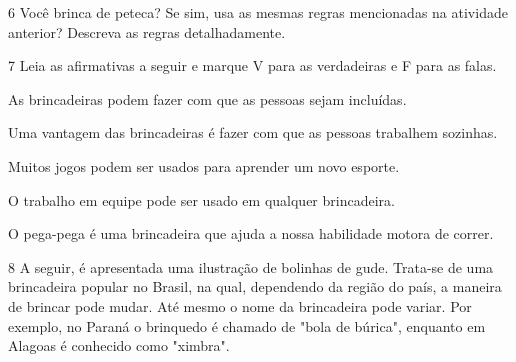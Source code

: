 \num{6} Você brinca de peteca? Se sim, usa as mesmas regras mencionadas na atividade anterior? Descreva as regras detalhadamente.


\num{7} Leia as afirmativas a seguir e marque V para as verdadeiras e F para
  as falas.

\begin{boxlist}
\item As brincadeiras podem fazer com que as pessoas sejam incluídas. 

\item Uma vantagem das brincadeiras é fazer com que as pessoas trabalhem sozinhas. 

\item Muitos jogos podem ser usados para aprender um novo esporte. 

\item O trabalho em equipe pode ser usado em qualquer brincadeira. 

\item O pega-pega é uma brincadeira que ajuda a nossa habilidade motora de correr. 
\end{boxlist}


\num{8} A seguir, é apresentada uma ilustração de bolinhas de gude. Trata-se de uma
  brincadeira popular no Brasil, na qual, dependendo da região do país, a
  maneira de brincar pode mudar. Até mesmo o nome da brincadeira pode variar. Por exemplo, no Paraná o brinquedo é chamado de "bola de búrica", enquanto em Alagoas
  é conhecido como "ximbra".

